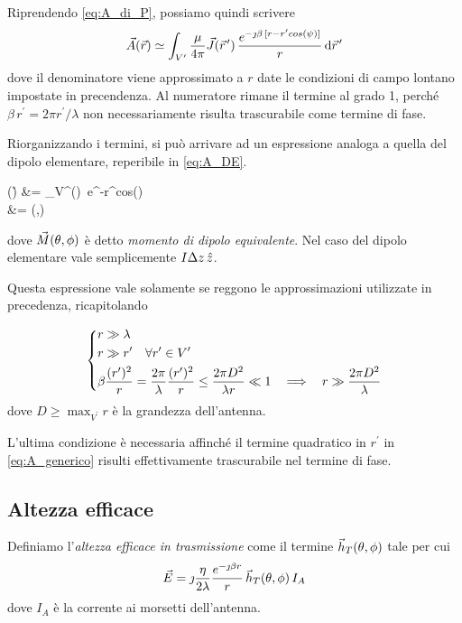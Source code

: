 Riprendendo \autoref{eq:A_di_P}, possiamo quindi scrivere
\begin{equation} \label{eq:A_generico}
	\A(\r)
	\simeq \int_{V^\prime} \frac{\mu}{4\pi} \J(\rp) \, \frac{e^{-\jmath\beta \, [r-r^\prime cos(\psi)]}}{r} \de \rp
\end{equation}
dove il denominatore viene approssimato a $r$ date le condizioni di campo lontano impostate in precendenza.
Al numeratore rimane il termine al grado 1, perché $\beta \, r^\prime = 2\pi r^\prime / \lambda$ non necessariamente risulta trascurabile come termine di fase.

Riorganizzando i termini, si può arrivare ad un espressione analoga a quella del dipolo elementare, reperibile in \autoref{eq:A_DE}.

\begin{esp*}
	\A(\r)
	&=
	\int_{V^\prime}\J(\rp)\, e^{-\jmath\beta r^\prime cos(\psi)} \de \rp \\
	&= \M(\theta,\phi)\\
\end{esp*}
dove $\vec{M}(\theta,\phi)$ è detto \emph{momento di dipolo equivalente}.
Nel caso del dipolo elementare vale semplicemente $I \Delta z \,\hat{z}$.

Questa espressione vale solamente se reggono le approssimazioni utilizzate in precedenza, ricapitolando

\begin{equation} \label{eq:campo_lontano_generico}
	\begin{dcases}
		r \gg \lambda \\
		r \gg r^\prime \quad \forall r^\prime \in V^\prime \\
		\beta \frac{(r^\prime)^2}{r}
		= \frac{2\pi}{\lambda} \frac{(r^\prime)^2}{r}
		\le \frac{2\pi D^2}{\lambda r}
		\ll 1
		~~ \implies ~~
		r \gg \frac{2\pi D^2}{\lambda}
	\end{dcases}
\end{equation}
dove $D \ge \max_{V^\prime} r$ è la grandezza dell'antenna.

L'ultima condizione è necessaria affinché il termine quadratico in $r^\prime$ in \autoref{eq:A_generico} risulti effettivamente trascurabile nel termine di fase.

\subsection{Altezza efficace}
Definiamo l'\emph{altezza efficace in trasmissione} come il termine $\vec{h}_T(\theta,\phi)$ tale per cui
\begin{equation}
	\vec{E}
	= \jmath \frac{\eta}{2\lambda} \frac{e^{-\jmath \beta r}}{r} \, \vec{h}_T(\theta,\phi) \, I_A
\end{equation}
dove $I_A$ è la corrente ai morsetti dell'antenna.

